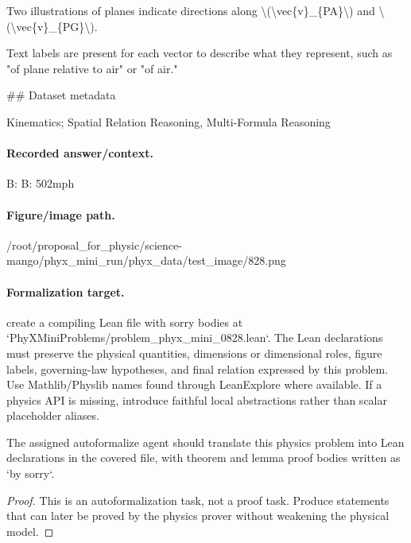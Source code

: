 Two illustrations of planes indicate directions along \textbackslash{}(\textbackslash{}vec\{v\}\_\{PA\}\textbackslash{}) and \textbackslash{}(\textbackslash{}vec\{v\}\_\{PG\}\textbackslash{}).

Text labels are present for each vector to describe what they represent, such as "of plane relative to air" or "of air."

\#\# Dataset metadata

Kinematics; Spatial Relation Reasoning, Multi-Formula Reasoning

\paragraph{Recorded answer/context.}
B: B: 502mph

\paragraph{Figure/image path.}
/root/proposal\_for\_physic/science-mango/phyx\_mini\_run/phyx\_data/test\_image/828.png

\paragraph{Formalization target.}
create a compiling Lean file with sorry bodies at `PhyXMiniProblems/problem\_phyx\_mini\_0828.lean`. The Lean declarations must preserve the physical quantities, dimensions or dimensional roles, figure labels, governing-law hypotheses, and final relation expressed by this problem.
Use Mathlib/Physlib names found through LeanExplore where available. If a physics API is missing, introduce faithful local abstractions rather than scalar placeholder aliases.

\begin{theorem}
\label{thm:physics:phyx_mini_0828:target}
The assigned autoformalize agent should translate this physics problem into Lean declarations in the covered file, with theorem and lemma proof bodies written as `by sorry`.
\end{theorem}
\begin{proof}
This is an autoformalization task, not a proof task. Produce statements that can later be proved by the physics prover without weakening the physical model.
\end{proof}

